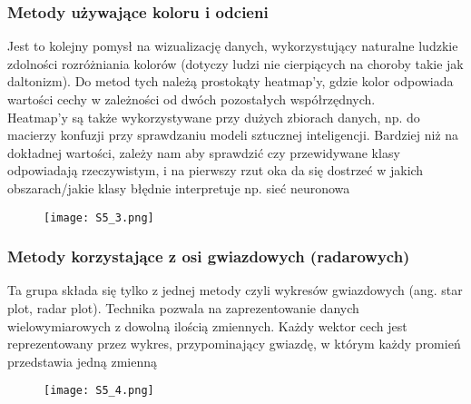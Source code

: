 \subsubsection{Metody używające koloru i odcieni}

Jest to kolejny pomysł na wizualizację danych, wykorzystujący naturalne ludzkie zdolności rozróżniania kolorów (dotyczy ludzi nie cierpiących na choroby takie jak daltonizm). Do metod tych należą prostokąty heatmap’y, gdzie kolor odpowiada wartości cechy w zależności od dwóch pozostałych współrzędnych. \\

Heatmap’y są także wykorzystywane przy dużych zbiorach danych, np. do macierzy konfuzji przy sprawdzaniu modeli sztucznej inteligencji. Bardziej niż na dokładnej wartości, zależy nam aby sprawdzić czy przewidywane klasy odpowiadają rzeczywistym, i na pierwszy rzut oka da się dostrzeć w jakich obszarach/jakie klasy błędnie interpretuje np. sieć neuronowa

\begin{figure}[H]
	\centering
	\texttt{[image: S5\_3.png]}
\end{figure}

\subsubsection{Metody korzystające z osi gwiazdowych (radarowych)}

Ta grupa składa się tylko z jednej metody czyli wykresów gwiazdowych (ang. star plot, radar plot). Technika pozwala na zaprezentowanie danych wielowymiarowych z dowolną ilością zmiennych. Każdy wektor cech jest reprezentowany przez wykres, przypominający gwiazdę, w którym każdy promień przedstawia jedną zmienną

\begin{figure}[H]
	\centering
	\texttt{[image: S5\_4.png]}
\end{figure}